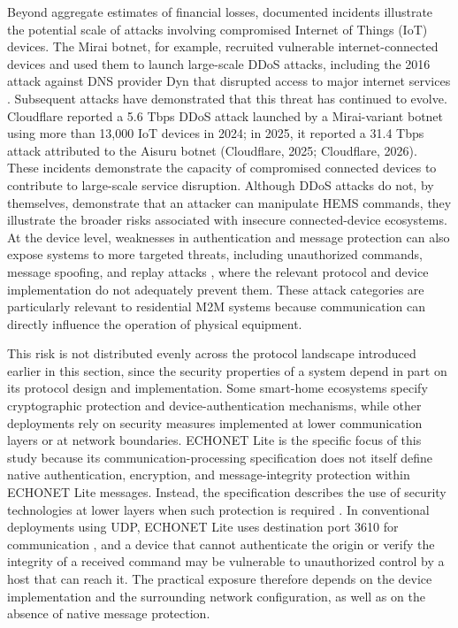 Beyond aggregate estimates of financial losses, documented incidents illustrate the potential scale of attacks involving compromised Internet of Things (IoT) devices. The Mirai botnet, for example, recruited vulnerable internet-connected devices and used them to launch large-scale DDoS attacks, including the 2016 attack against DNS provider Dyn that disrupted access to major internet services \citep{antonakakisUnderstandingMiraiBotnet}. Subsequent attacks have demonstrated that this threat has continued to evolve. Cloudflare reported a 5.6 Tbps DDoS attack launched by a Mirai-variant botnet using more than 13,000 IoT devices in 2024; in 2025, it reported a 31.4 Tbps attack attributed to the Aisuru botnet (Cloudflare, 2025; Cloudflare, 2026). These incidents demonstrate the capacity of compromised connected devices to contribute to large-scale service disruption. Although DDoS attacks do not, by themselves, demonstrate that an attacker can manipulate HEMS commands, they illustrate the broader risks associated with insecure connected-device ecosystems. At the device level, weaknesses in authentication and message protection can also expose systems to more targeted threats, including unauthorized commands, message spoofing, and replay attacks \citep{almaniAssessingSecurityVulnerabilities2025,heartfieldTaxonomyCyberphysicalThreats2018,AlJanah2021}, where the relevant protocol and device implementation do not adequately prevent them. These attack categories are particularly relevant to residential M2M systems because communication can directly influence the operation of physical equipment.

This risk is not distributed evenly across the protocol landscape introduced earlier in this section, since the security properties of a system depend in part on its protocol design and implementation. Some smart-home ecosystems specify cryptographic protection and device-authentication mechanisms, while other deployments rely on security measures implemented at lower communication layers or at network boundaries. ECHONET Lite is the specific focus of this study because its communication-processing specification does not itself define native authentication, encryption, and message-integrity protection within ECHONET Lite messages. Instead, the specification describes the use of security technologies at lower layers when such protection is required \citep{ECHONETPart2,eissaDevelopingIncentiveDemand2019}. In conventional deployments using UDP, ECHONET Lite uses destination port 3610 for communication \citep{ECHONETPart2,sangumpaiDevelopmentRealTimeInterworking2017}, and a device that cannot authenticate the origin or verify the integrity of a received command may be vulnerable to unauthorized control by a host that can reach it. The practical exposure therefore depends on the device implementation and the surrounding network configuration, as well as on the absence of native message protection.

